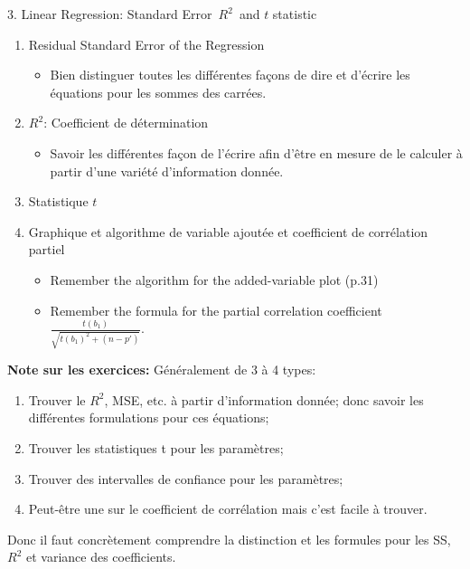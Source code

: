 \documentclass[12pt, titlepage, french]{report}
\begin{document}
\begin{CHPT_SUMM}{3. Linear Regression: Standard Error\, $R^{2}$\, and $t$ statistic}
\begin{enumerate}
	\item	Residual Standard Error of the Regression
	\begin{itemize}
		\item	Bien distinguer toutes les différentes façons de dire et d'écrire les équations pour les sommes des carrées.
	\end{itemize}
	\item	$R^{2}$: Coefficient de détermination
	\begin{itemize}
		\item	Savoir les différentes façon de l'écrire afin d'être en mesure de le calculer à partir d'une variété d'information donnée.
	\end{itemize}
	\item	Statistique $t$
	\item	Graphique et algorithme de variable ajoutée et coefficient de corrélation partiel
	\begin{itemize}
		\item	Remember the algorithm for the added-variable plot (p.31)
		\item	Remember the formula for the partial correlation coefficient $\frac{t(b_{1})}{\sqrt{t(b_{1})^{2} + (n - p')}}$.
	\end{itemize}
\end{enumerate}
\textbf{Note sur les exercices:} Généralement de 3 à 4 types:
\begin{enumerate}
	\item	Trouver le $R^{2}$, MSE, etc. à partir d'information donnée; donc savoir les différentes formulations pour ces équations;
	\item	Trouver les statistiques t pour les paramètres;
	\item	Trouver des intervalles de confiance pour les paramètres;
	\item	Peut-être une sur le coefficient de corrélation mais c'est facile à trouver.
\end{enumerate}
Donc il faut concrètement comprendre la distinction et les formules pour les SS, $R^{2}$ et variance des coefficients.
\end{CHPT_SUMM}
\end{document}
